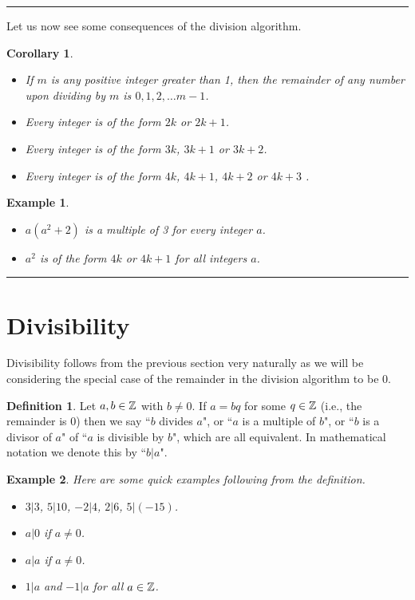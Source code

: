 \documentclass[12pt]{article}
\theoremstyle{plain}
\newtheorem{corollary}{Corollary}
\newtheorem{example}{Example}
\theoremstyle{definition}
\newtheorem{definition}{Definition}
\theoremstyle{remark}
\begin{document}
\bigskip
\hrule

\bigskip
\noindent
Let us now see some consequences of the division algorithm.
\begin{corollary}
    \begin{itemize}
        \item If $m$ is any positive integer greater than 1, then the remainder of any number upon dividing by $m$ is $0, 1, 2, \dots m-1$.
        \item Every integer is of the form $2k$ or $2k+1$.
        \item Every integer is of the form $3k$, $3k+1$ or $3k+2$.
        \item Every integer is of the form $4k$, $4k+1$, $4k+2$ or $4k+3$
.    \end{itemize}
\end{corollary}

\bigskip
\noindent
\begin{example}
\begin{itemize}
    \item $a(a^2+2)$ is a multiple of 3 for every integer $a$.
    \item $a^2$ is of the form $4k$ or $4k+1$ for all integers $a$.
\end{itemize}

\end{example}


\bigskip
\hrule

	\section{Divisibility}
Divisibility follows from the previous section very naturally as we will be considering the special case of the remainder in the division algorithm to be 0.

\begin{definition}
    Let $a,b \in \mathbb{Z}$ with $b\neq 0$. If $a=bq$ for some $q\in \mathbb{Z}$ (i.e., the remainder is 0) then we say ``$b$ divides $a$", or ``$a$ is a multiple of $b$", or ``$b$ is a divisor of $a$" of ``$a$ is divisible by $b$", which are all equivalent. In mathematical notation we denote this by ``$b|a$".
\end{definition}
\begin{example}
Here are some quick examples following from the definition.
\begin{itemize}
    \item $3|3$,  \:\:\:\: $5|10$, \:\:\:\: $-2|4$, \:\:\:\: $2|6$, \:\:\:\: $5|(-15)$.
    \item $a|0$ if $a\neq 0$.
    \item $a|a$ if $a\neq 0$.
    \item $1|a$ and $-1|a$ for all $a\in \mathbb{Z}$.
\end{itemize}
\end{example}
\end{document}
